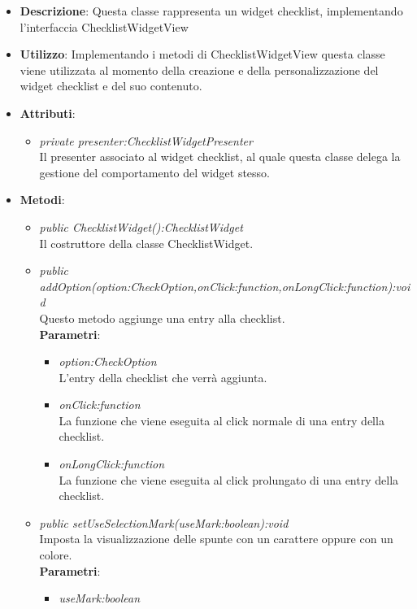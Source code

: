 \begin{itemize}
\item \textbf{Descrizione}: Questa classe rappresenta un widget checklist, implementando l'interfaccia ChecklistWidgetView
\item \textbf{Utilizzo}: Implementando i metodi di ChecklistWidgetView questa classe viene utilizzata al momento della creazione e della personalizzazione del widget checklist e del suo contenuto.
\item \textbf{Attributi}:
	\begin{itemize}
	\item \textit{private presenter:ChecklistWidgetPresenter}\\
	Il presenter associato al widget checklist, al quale questa classe delega la gestione del comportamento del widget stesso.
	\end{itemize}
\item \textbf{Metodi}:
	\begin{itemize}
	\item \textit{public ChecklistWidget():ChecklistWidget}\\
	Il costruttore della classe ChecklistWidget.
	\item \textit{public addOption(option:CheckOption,onClick:function,onLongClick:function):void}\\
	Questo metodo aggiunge una entry alla checklist.
		\\ \textbf{Parametri}: \begin{itemize}
		\item \textit{option:CheckOption}\\
		L'entry della checklist che verrà aggiunta.
		\item \textit{onClick:function}\\
		La funzione che viene eseguita al click normale di una entry della checklist.
		\item \textit{onLongClick:function}\\
		La funzione che viene eseguita al click prolungato di una entry della checklist.
		\end{itemize} 
	\item \textit{public setUseSelectionMark(useMark:boolean):void}\\
		Imposta la visualizzazione delle spunte con un carattere oppure con un colore.
			\\ \textbf{Parametri}: \begin{itemize}
			\item \textit{useMark:boolean}\\

\end{itemize}
\end{itemize}
\end{itemize}
